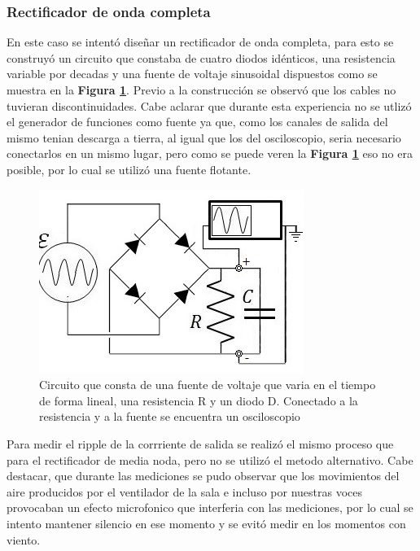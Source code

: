 \documentclass[11pt,a4paper]{article}
\begin{document}
\subsubsection{Rectificador de onda completa}
En este caso se intentó diseñar un rectificador de onda completa, para esto se construyó un circuito que constaba de cuatro diodos idénticos, una resistencia variable por decadas y una fuente de voltaje sinusoidal dispuestos como se muestra en la \textbf{Figura \ref{fig:Rect-O}}. Previo a la construcción se observó que los cables no tuvieran discontinuidades. Cabe aclarar que durante esta experiencia no se utlizó el generador de funciones como fuente ya que, como los canales de salida del mismo tenian descarga a tierra, al igual que los del osciloscopio, seria necesario conectarlos en un mismo lugar, pero como se puede veren la \textbf{Figura \ref{fig:Rect-O}} eso no era posible, por lo cual se utilizó una fuente flotante. 

\begin{figure}[H]
\centering
\includegraphics[scale=0.8]{Rectificador-Onda-Completa}
   \caption{Circuito que consta de una fuente de voltaje que varia en el tiempo de forma lineal, una resistencia R y un diodo D. Conectado a la resistencia y a la fuente se encuentra un osciloscopio}
   \label{fig:Rect-O}
\end{figure}

Para medir el ripple de la corrriente de salida se realizó el mismo proceso que para el rectificador de media noda, pero no se utilizó el metodo alternativo. Cabe destacar, que durante las mediciones se pudo observar que los movimientos del aire producidos por el ventilador de la sala e incluso por nuestras voces provocaban un efecto microfonico que interferia con las mediciones, por lo cual se intento mantener silencio en ese momento y se evitó medir en los momentos con viento.


\end{document}
